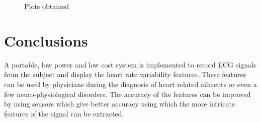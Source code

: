 \documentclass[11pt]{article}
\theoremstyle{definition}
\begin{document}
  \begin{figure}
    \centering
    \qquad
    \qquad
    \qquad
    \qquad
    \caption{Plots obtained}
    \label{fig:globfig2}
  \end{figure}


  \newpage
  \section{Conclusions}
  A portable, low power and low cost system is implemented to record ECG signals from the subject and display the heart rate variability features. These features can be used by physicians during the diagnosis of heart related ailments or even a few neuro-physiological disorders. The accuracy of the features can be improved by using sensors which give better accuracy using which the more intricate features of the signal can be extracted.
\end{document}
